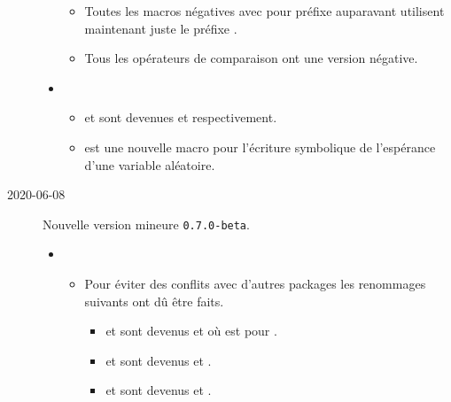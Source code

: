 \documentclass[12pt,a4paper]{article}
\begin{document}
\begin{description}
\begin{itemize}[itemsep=.5em]
\begin{itemize}[itemsep=.5em]
            \item Toutes les macros négatives avec pour préfixe  auparavant utilisent maintenant juste le préfixe .
    
            \item Tous les opérateurs de comparaison ont une version négative.
        \end{itemize}
    
    
    
    
        \separation
        \item {}
        \begin{itemize}[itemsep=.5em]
            \item {} et  sont devenues  et  respectivement.
            
            \item {} est une nouvelle macro pour l'écriture symbolique de l'espérance d'une  variable aléatoire.
        \end{itemize}
    \end{itemize}
    


    \medskip
    \item[2020-06-08] Nouvelle version mineure \verb+0.7.0-beta+.
    
    \begin{itemize}[itemsep=.5em]
        \item {}
        \begin{itemize}[itemsep=.5em]
            \item Pour éviter des conflits avec d'autres packages les renommages suivants ont dû être faits.
            \begin{itemize}[itemsep=.5em, label=$\rightarrow$]
                \item {} et  sont devenus  et  où  est pour .
    
                \item {} et  sont devenus  et .
    
                \item {} et  sont devenus  et .
            \end{itemize}
    

\end{itemize}
\end{itemize}
\end{description}
\end{document}

